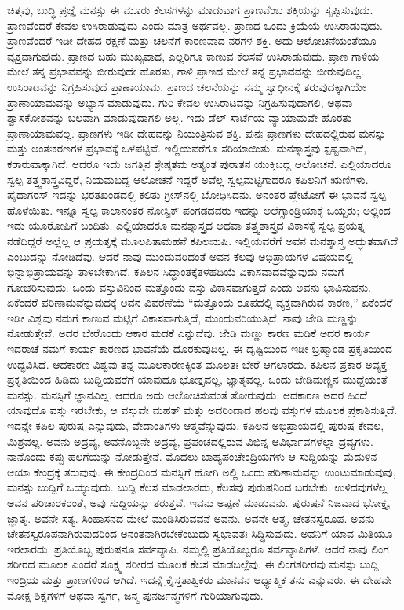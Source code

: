 ಚಿತ್ತವು, ಬುದ್ಧಿ ಪ್ರಜ್ಞೆ ಮನಸ್ಸು ಈ ಮೂರು ಕೆಲಸಗಳನ್ನು ಮಾಡುವಾಗ ಪ್ರಾಣವೆಂಬ ಶಕ್ತಿಯನ್ನು ಸೃಷ್ಟಿಸುವುದು. ಪ್ರಾಣವೆಂದರೆ ಕೇವಲ ಉಸಿರಾಡುವುದು ಎಂದು ಮಾತ್ರ ಅರ್ಥವಲ್ಲ. ಪ್ರಾಣದ ಒಂದು ಕ್ರಿಯೆಯೆ ಉಸಿರಾಡುವುದು. ಪ್ರಾಣವೆಂದರೆ ಇಡೀ ದೇಹದ ರಕ್ಷಣೆ ಮತ್ತು ಚಲನೆಗೆ ಕಾರಣವಾದ ನರಗಳ ಶಕ್ತಿ. ಅದು ಆಲೋಚನೆಯಂತೆಯೂ ವ್ಯಕ್ತವಾಗುವುದು. ಪ್ರಾಣದ ಬಹು ಮುಖ್ಯವಾದ, ಎಲ್ಲರಿಗೂ ಕಾಣುವ ಕೆಲಸವೆ ಉಸಿರಾಡುವುದು. ಪ್ರಾಣ ಗಾಳಿಯ ಮೇಲೆ ತನ್ನ ಪ್ರಭಾವವನ್ನು ಬೀರುವುದೇ ಹೊರತು, ಗಾಳಿ ಪ್ರಾಣದ ಮೇಲೆ ತನ್ನ ಪ್ರಭಾವವನ್ನು ಬೀರುವುದಿಲ್ಲ. ಉಸಿರಾಟವನ್ನು ನಿಗ್ರಹಿಸುವುದೆ ಪ್ರಾಣಾಯಾಮ. ಪ್ರಾಣದ ಚಲನೆಯನ್ನು ನಮ್ಮ ಸ್ವಾಧೀನಕ್ಕೆ ತರುವುದಕ್ಕಾಗಿಯೇ ಪ್ರಾಣಾಯಾಮವನ್ನು ಅಭ್ಯಾಸ ಮಾಡುವುದು. ಗುರಿ ಕೇವಲ ಉಸಿರಾಟವನ್ನು ನಿಗ್ರಹಿಸುವುದಾಗಲಿ, ಅಥವಾ ಶ್ವಾಸಕೋಶವನ್ನು ಬಲವಾಗಿ ಮಾಡುವುದಾಗಲಿ ಅಲ್ಲ. ಇದು ಡೆಲ್ ಸಾರ್ಟೆಯ ವ್ಯಾಯಾಮವೇ ಹೊರತು ಪ್ರಾಣಾಯಾಮವಲ್ಲ. ಪ್ರಾಣಗಳು ಇಡೀ ದೇಹವನ್ನು ನಿಯಂತ್ರಿಸುವ ಶಕ್ತಿ. ಪುನಃ ಪ್ರಾಣಗಳು ದೇಹದಲ್ಲಿರುವ ಮನಸ್ಸು ಮತ್ತು ಅಂತಃಕರಣಗಳ ಪ್ರಭಾವಕ್ಕೆ ಒಳಪಟ್ಟಿವೆ. ಇಲ್ಲಿಯವರೆಗೂ ಸರಿಯಾಯಿತು. ಮನಶ್ಶಾಸ್ತ್ರವು ಸ್ಪಷ್ಟವಾಗಿದೆ, ಕರಾರುವಾಕ್ಕಾಗಿದೆ. ಆದರೂ ಇದು ಜಗತ್ತಿನ ಶ್ರೇಷ್ಠತಮ ಅತ್ಯಂತ ಪುರಾತನ ಯುಕ್ತಿಬದ್ದ ಆಲೋಚನೆ. ಎಲ್ಲಿಯಾದರೂ ಸ್ವಲ್ಪ ತತ್ತ್ವಶಾಸ್ತ್ರವಿದ್ದರೆ, ನಿಯಮಬದ್ದ ಆಲೋಚನೆ ಇದ್ದರೆ ಅವೆಲ್ಲ ಸ್ವಲ್ಪಮಟ್ಟಿಗಾದರೂ ಕಪಿಲನಿಗೆ ಋಣಿಗಳು. ಪೈಥಾಗರಸ್ ಇದನ್ನು ಭರತಖಂಡದಲ್ಲಿ ಕಲಿತು ಗ್ರೀಸ್‌ನಲ್ಲಿ ಬೋಧಿಸಿದನು. ಅನಂತರ ಪ್ಲೇಟೋಗೆ ಈ ಭಾವನೆ ಸ್ವಲ್ಪ ಹೊಳೆಯಿತು. ಇನ್ನೂ ಸ್ವಲ್ಪ ಕಾಲಾನಂತರ ನೋಸ್ಟಿಕ್ ಪಂಗಡದವರು ಇದನ್ನು ಅಲೆಗ್ಸಾಂಡ್ರಿಯಾಕ್ಕೆ ಒಯ್ದರು; ಅಲ್ಲಿಂದ ಇದು ಯೂರೋಪಿಗೆ ಬಂದಿತು. ಎಲ್ಲಿಯಾದರೂ ಮನಶ್ಶಾಸ್ತ್ರದ ಅಥವಾ ತತ್ತ್ವಶಾಸ್ತ್ರದ ವಿಕಾಸಕ್ಕೆ ಸ್ವಲ್ಪ ಪ್ರಯತ್ನ ನಡೆದಿದ್ದರೆ ಅಲ್ಲೆಲ್ಲ ಆ ಪ್ರಯತ್ನಕ್ಕೆ ಮೂಲಪಿತಾಮಹನೆ ಕಪಿಲಋಷಿ. ಇಲ್ಲಿಯವರೆಗೆ ಅವನ ಮನಶ್ಶಾಸ್ತ್ರ ಅದ್ಭುತವಾಗಿದೆ ಎಂಬುದನ್ನು ನೋಡಿದೆವು. ಆದರೆ ನಾವು ಮುಂದುವರಿದಂತೆ ಅವನ ಕೆಲವು ಅಭಿಪ್ರಾಯ\-ಗಳ ವಿಷಯದಲ್ಲಿ ಭಿನ್ನಾಭಿಪ್ರಾಯವನ್ನು ತಾಳಬೇಕಾಗಿದೆ. ಕಪಿಲನ ಸಿದ್ಧಾಂತಕ್ಕೆ\break ತಳಹದಿಯೆ ವಿಕಾಸವಾದವೆನ್ನುವುದು ನಮಗೆ ಗೋಚರಿಸುವುದು. ಒಂದು ವಸ್ತುವಿನಿಂದ ಮತ್ತೊಂದು ವಸ್ತು ವಿಕಾಸವಾಗುತ್ತದೆ ಎಂದು ಅವನು ಭಾವಿಸುವನು. ಏಕೆಂದರೆ ಪರಿಣಾಮವೆನ್ನುವುದಕ್ಕೆ ಅವನ ವಿವರಣೆಯೆ “ಮತ್ತೊಂದು ರೂಪದಲ್ಲಿ ವ್ಯಕ್ತವಾಗಿರುವ ಕಾರಣ,'' ಏಕೆಂದರೆ ಇಡೀ ವಿಶ್ವವು ನಮಗೆ ಕಾಣುವ ಮಟ್ಟಿಗೆ ವಿಕಾಸವಾಗುತ್ತಿದೆ, ಮುಂದುವರಿಯುತ್ತಿದೆ. ನಾವು ಜೇಡಿ ಮಣ್ಣನ್ನು ನೋಡುತ್ತೇವೆ. ಅದರ ಬೇರೊಂದು ಆಕಾರ ಮಡಕೆ ಎನ್ನುವೆವು. ಜೇಡಿ ಮಣ್ಣು ಕಾರಣ ಮಡಿಕೆ ಅದರ ಕಾರ್ಯ ಇದರಾಚೆ ನಮಗೆ ಕಾರ್ಯ ಕಾರಣದ ಭಾವನೆಯೆ ದೊರಕುವುದಿಲ್ಲ. ಈ ದೃಷ್ಟಿಯಿಂದ ಇಡೀ ಬ್ರಹ್ಮಾಂಡ ಪ್ರಕೃತಿಯಿಂದ ಉದ್ಭವಿಸಿದೆ. ಆದಕಾರಣ ವಿಶ್ವವು ತನ್ನ ಮೂಲಕಾರಣಕ್ಕಿಂತ ಮೂಲತಃ ಬೇರೆ ಆಗಲಾರದು. ಕಪಿಲನ ಪ್ರಕಾರ ಅವ್ಯಕ್ತ ಪ್ರಕೃತಿಯಿಂದ ಹಿಡಿದು ಬುದ್ದಿಯವರೆಗೆ ಯಾವುದೂ ಭೋಕ್ತೃವಲ್ಲ, ಜ್ಞಾತೃವಲ್ಲ. ಒಂದು ಜೇಡಿಮಣ್ಣಿನ ಮುದ್ದೆಯಂತೆ ಮನಸ್ಸು. ಮನಸ್ಸಿಗೆ ಜ್ಞಾನವಿಲ್ಲ. ಆದರೂ ಅದು ಆಲೋಚಿಸುವಂತೆ ತೋರುವುದು. ಆದಕಾರಣ ಅದರ ಹಿಂದೆ ಯಾವುದೊ ವಸ್ತು ಇರಬೇಕು, ಆ ವಸ್ತುವೇ ಮಹತ್ ಮತ್ತು ಅದರಿಂದಾದ ಹಲವು ವಸ್ತುಗಳ ಮೂಲಕ ಪ್ರಕಾಶಿಸುತ್ತಿದೆ. ಇದನ್ನೇ ಕಪಿಲ ಪುರುಷ ಎನ್ನುವುದು, ವೇದಾಂತಿಗಳು ಆತ್ಮವೆನ್ನುವುದು. ಕಪಿಲನ ಅಭಿಪ್ರಾಯದಲ್ಲಿ ಪುರುಷ ಕೇವಲ, ಮಿಶ್ರವಲ್ಲ. ಅವನು ಅದ್ರವ್ಯ, ಅವನೊಬ್ಬನೇ ಅದ್ರವ್ಯ, ಪ್ರಪಂಚದಲ್ಲಿರುವ ವಿಭಿನ್ನ ಆವಿರ್ಭಾವಗಳೆಲ್ಲಾ ದ್ರವ್ಯಗಳು. ನಾನೊಂದು ಕಪ್ಪು ಹಲಗೆಯನ್ನು ನೋಡುತ್ತೇನೆ. ಮೊದಲು ಬಾಹ್ಯಪಂಚೇಂದ್ರಿಯಗಳು ಆ ಸುದ್ದಿಯನ್ನು ಮೆದುಳಿನ ಆಯಾ ಕೇಂದ್ರಕ್ಕೆ ತರುವುವು. ಈ ಕೇಂದ್ರದಿಂದ ಮನಸ್ಸಿಗೆ ಹೋಗಿ ಅಲ್ಲಿ ಒಂದು ಪರಿಣಾಮವನ್ನು ಉಂಟುಮಾಡುವುವು, ಮನಸ್ಸು ಬುದ್ದಿಗೆ ಒಯ್ಯುವುದು. ಬುದ್ದಿ ಕೆಲಸ ಮಾಡಲಾರದು, ಕೆಲಸವು ಪುರುಷನಿಂದ ಬರಬೇಕು. ಉಳಿದವುಗಳೆಲ್ಲ ಅವನ ಪರಿಚಾರಕರಂತೆ, ಅವು ಸುದ್ದಿಯನ್ನು ತರುತ್ತವೆ. ಇವನು ಅಪ್ಪಣೆ ಮಾಡುವನು. ಪುರುಷನೆ ನಿಜವಾದ ಭೋಕ್ತೃ, ಜ್ಞಾತೃ. ಅವನೇ ಸತ್ಯ. ಸಿಂಹಾಸನದ ಮೇಲೆ ಮಂಡಿಸಿರುವವನೆ ಅವನು. ಅವನೇ ಆತ್ಮ, ಚೇತನಸ್ವರೂಪ. ಅವನು ಚೇತನಸ್ವರೂಪನಾಗಿರುವುದರಿಂದ ಅನಂತನಾಗಿರಬೇಕೆಂಬುದು ಸ್ವಭಾವತಃ ಸಿದ್ಧಿಸುವುದು. ಅವನಿಗೆ ಯಾವ ಮಿತಿಯೂ ಇರಲಾರದು. ಪ್ರತಿಯೊಬ್ಬ ಪುರುಷನೂ ಸರ್ವವ್ಯಾಪಿ. ನಮ್ಮಲ್ಲಿ ಪ್ರತಿಯೊಬ್ಬರೂ ಸರ್ವವ್ಯಾಪಿಗಳೆ. ಆದರೆ ನಾವು ಲಿಂಗ ಶರೀರದ ಮೂಲಕ ಎಂದರೆ ಸೂಕ್ಷ್ಮ ಶರೀರದ ಮೂಲಕ ಕೆಲಸ ಮಾಡಬಲ್ಲೆವು. ಈ ಲಿಂಗಶರೀರವು ಮನಸ್ಸು ಬುದ್ದಿ ಇಂದ್ರಿಯ ಮತ್ತು ಪ್ರಾಣಗಳಿಂದ ಆಗಿದೆ. ಇದನ್ನೆ ಕ್ರೈಸ್ತತಾತ್ವಿಕರು ಮಾನವನ ಆಧ್ಯಾತ್ಮಿಕ ತನು ಎನ್ನುವರು. ಈ ದೇಹವೇ ಮೋಕ್ಷ ಶಿಕ್ಷೆಗಳಿಗೆ ಅಥವಾ ಸ್ವರ್ಗ, ಜನ್ಮ ಪುನರ್ಜನ್ಮಗಳಿಗೆ ಗುರಿಯಾಗುವುದು. 